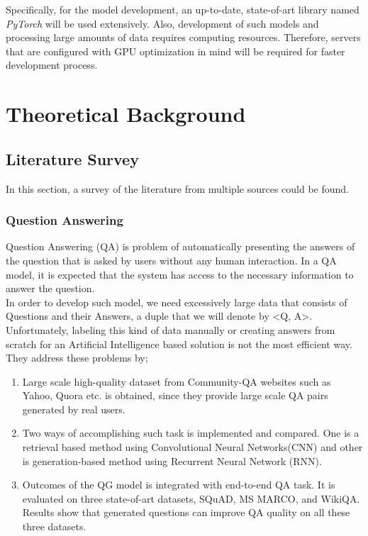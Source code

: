 \documentclass{mefsdp}
\begin{document}
	Specifically, for the model development, an up-to-date, state-of-art library named \textit{PyTorch} will be used extensively. Also, development of such models and processing large amounts of data requires computing resources. Therefore, servers that are configured with GPU optimization in mind will be required for faster development process.
	
	
	
	\section{Theoretical Background}
	\subsection{Literature Survey}
	In this section, a survey of the literature from multiple sources could be found.
	\subsubsection{Question Answering}
	Question Answering (QA) is problem of automatically presenting the answers of the question that is asked by users without any human interaction. In a QA model, it is expected that the system has access to the necessary information to answer the question.\\
	In order to develop such model, we need excessively large data that consists of Questions and their Answers, a duple that we will denote by <Q, A>. Unfortunately, labeling this kind of data manually or creating answers from scratch for an Artificial Intelligence based solution is not the most efficient way.
	They address these problems by;
	\begin{enumerate}
		\item Large scale high-quality dataset from Community-QA websites such as Yahoo, Quora etc. is obtained, since they provide large scale QA pairs generated by real users.
		\item Two ways of accomplishing such task is implemented and compared. One is a retrieval based method using Convolutional Neural Networks(CNN) and other is generation-based method using Recurrent Neural Network (RNN).
		\item Outcomes of the QG model is integrated with end-to-end QA task. It is evaluated on three state-of-art datasets, SQuAD, MS MARCO, and WikiQA. Results show that generated questions can improve QA quality on all these three datasets.
	\end{enumerate}
	
\end{document}
